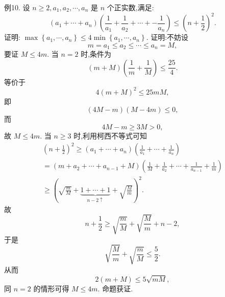 例10. 设 $n \geqslant 2, a_1, a_2, \cdots, a_n$ 是 $n$ 个正实数,满足:
$$
\left(a_1+\cdots+a_n\right)\left(\frac{1}{a_1}+\frac{1}{a_2}+\cdots+-\frac{1}{a_n}\right) \leqslant\left(n+\frac{1}{2}\right)^2 .
$$
证明: $\max \left\{a_1, \cdots, a_n\right\} \leqslant 4 \min \left\{a_1, \cdots, a_n\right\}$.
证明:不妨设
$$
m=a_1 \leqslant a_2 \leqslant \cdots \leqslant a_n=M,
$$
要证 $M \leqslant 4 m$.
当 $n=2$ 时,条件为
$$
(m+M)\left(\frac{1}{m}+\frac{1}{M}\right) \leqslant \frac{25}{4} .
$$
等价于
$$
4(m+M)^2 \leqslant 25 m M,
$$
即
$$
(4 M-m)(M-4 m) \leqslant 0,
$$
而
$$
4 M-m \geqslant 3 M>0,
$$
故 $M \leqslant 4 m$.
当 $n \geqslant 3$ 时,利用柯西不等式可知
$$
\begin{gathered}
\left(n+\frac{1}{2}\right)^2 \geqslant\left(a_1+\cdots+a_n\right)\left(\frac{1}{a_1}+\cdots+\frac{1}{a_n}\right) \\
=\left(m+a_2+\cdots+a_{n-1}+M\right)\left(\frac{1}{M}+\frac{1}{a_2}+\cdots+\frac{1}{a_{n-1}}+\frac{1}{m}\right) \\
\geqslant(\sqrt{\frac{m}{M}}+\underbrace{1+\cdots+1}_{n-2 \uparrow}+\sqrt{\frac{M}{m}})^2 .
\end{gathered}
$$
故
$$
n+\frac{1}{2} \geqslant \sqrt{\frac{m}{M}}+\sqrt{\frac{M}{m}}+n-2,
$$
于是
$$
\sqrt{\frac{M}{m}}+\sqrt{\frac{m}{M}} \leqslant \frac{5}{2} .
$$
从而
$$
2(m+M) \leqslant 5 \sqrt{m M},
$$
同 $n=2$ 的情形可得 $M \leqslant 4 m$. 命题获证.



